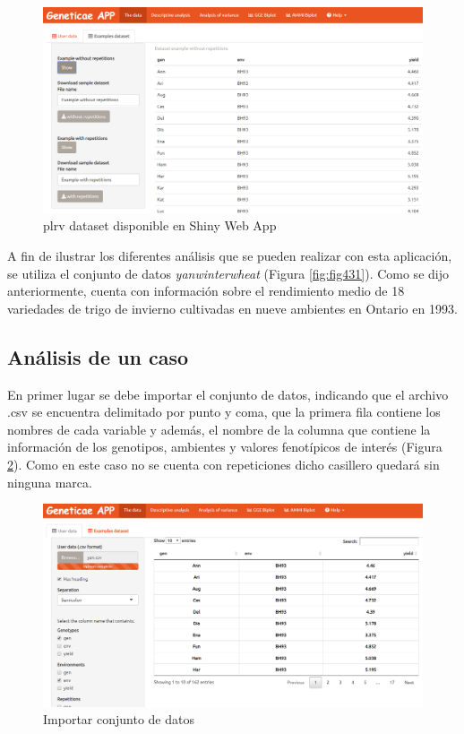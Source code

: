 \begin{figure}[H]
	\begin{center}
		\includegraphics[width=16cm]{./Graficos/Exampledatasets_withrep.png}
	\end{center}
	\caption{plrv dataset disponible en Shiny Web App}
	\label{fig:fig432}
\end{figure}


A fin de ilustrar los diferentes análisis que se pueden realizar con esta aplicación, se utiliza el conjunto de datos \emph{yanwinterwheat} (Figura \ref{fig:fig431}). Como se dijo anteriormente, cuenta con información sobre el rendimiento medio de 18 variedades de trigo de invierno cultivadas en nueve ambientes en Ontario en 1993.


\subsection{Análisis de un caso}
En primer lugar se debe importar el conjunto de datos, indicando que el archivo .csv se encuentra delimitado por punto y coma, que la primera fila contiene los nombres de cada variable y además, el nombre de la columna que contiene la información de los genotipos, ambientes y valores fenotípicos de interés (Figura \ref{fig:fig433}). Como en este caso no se cuenta con repeticiones dicho casillero quedará sin ninguna marca. 

\begin{figure}[h]
	\begin{center}
		\includegraphics[width=16cm]{./Graficos/data.png}
	\end{center}
	\caption{Importar conjunto de datos}
	\label{fig:fig433}
\end{figure}


